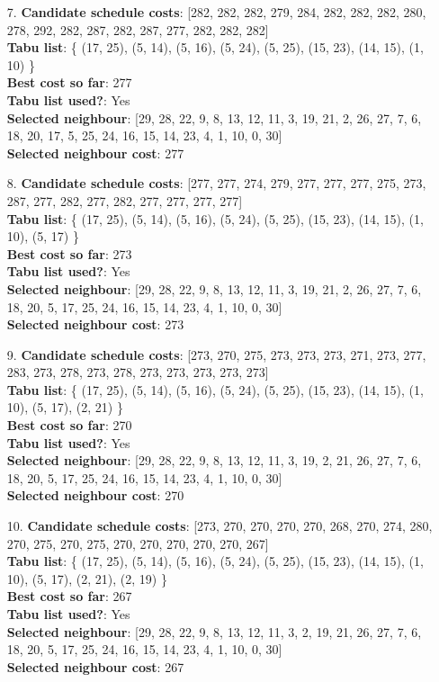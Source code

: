 \documentclass[fleqn]{article}
\begin{document}
\begin{itemize}
    \item[7.] \textbf{Candidate schedule costs}: [282, 282, 282, 279, 284, 282, 282, 282, 280, 278, 292, 282, 287, 282, 287, 277, 282, 282, 282] \\
    \textbf{Tabu list}: \{ (17, 25), (5, 14), (5, 16), (5, 24), (5, 25), (15, 23), (14, 15), (1, 10) \} \\
    \textbf{Best cost so far}: 277 \\
    \textbf{Tabu list used?}: Yes \\
    \textbf{Selected neighbour}: [29, 28, 22, 9, 8, 13, 12, 11, 3, 19, 21, 2, 26, 27, 7, 6, 18, 20, 17, 5, 25, 24, 16, 15, 14, 23, 4, 1, 10, 0, 30] \\
    \textbf{Selected neighbour cost}: 277
      

    \item[8.] \textbf{Candidate schedule costs}: [277, 277, 274, 279, 277, 277, 277, 275, 273, 287, 277, 282, 277, 282, 277, 277, 277, 277] \\
    \textbf{Tabu list}: \{ (17, 25), (5, 14), (5, 16), (5, 24), (5, 25), (15, 23), (14, 15), (1, 10), (5, 17) \} \\
    \textbf{Best cost so far}: 273 \\
    \textbf{Tabu list used?}: Yes \\
    \textbf{Selected neighbour}: [29, 28, 22, 9, 8, 13, 12, 11, 3, 19, 21, 2, 26, 27, 7, 6, 18, 20, 5, 17, 25, 24, 16, 15, 14, 23, 4, 1, 10, 0, 30] \\
    \textbf{Selected neighbour cost}: 273
      

    \item[9.] \textbf{Candidate schedule costs}: [273, 270, 275, 273, 273, 273, 271, 273, 277, 283, 273, 278, 273, 278, 273, 273, 273, 273, 273] \\
    \textbf{Tabu list}: \{ (17, 25), (5, 14), (5, 16), (5, 24), (5, 25), (15, 23), (14, 15), (1, 10), (5, 17), (2, 21) \} \\
    \textbf{Best cost so far}: 270 \\
    \textbf{Tabu list used?}: Yes \\
    \textbf{Selected neighbour}: [29, 28, 22, 9, 8, 13, 12, 11, 3, 19, 2, 21, 26, 27, 7, 6, 18, 20, 5, 17, 25, 24, 16, 15, 14, 23, 4, 1, 10, 0, 30] \\
    \textbf{Selected neighbour cost}: 270
      

    \item[10.] \textbf{Candidate schedule costs}: [273, 270, 270, 270, 270, 268, 270, 274, 280, 270, 275, 270, 275, 270, 270, 270, 270, 270, 267] \\
    \textbf{Tabu list}: \{ (17, 25), (5, 14), (5, 16), (5, 24), (5, 25), (15, 23), (14, 15), (1, 10), (5, 17), (2, 21), (2, 19) \} \\
    \textbf{Best cost so far}: 267 \\
    \textbf{Tabu list used?}: Yes \\
    \textbf{Selected neighbour}: [29, 28, 22, 9, 8, 13, 12, 11, 3, 2, 19, 21, 26, 27, 7, 6, 18, 20, 5, 17, 25, 24, 16, 15, 14, 23, 4, 1, 10, 0, 30] \\
    \textbf{Selected neighbour cost}: 267
      


\end{itemize}
\end{document}
